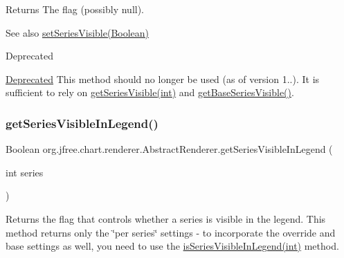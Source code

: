 \begin{DoxyReturn}{Returns}
The flag (possibly {\ttfamily null}).
\end{DoxyReturn}
\begin{DoxySeeAlso}{See also}
\mbox{\hyperlink{classorg_1_1jfree_1_1chart_1_1renderer_1_1_abstract_renderer_a0d8478845dba91f92a5d6b5d3b97b0d1}{set\+Series\+Visible(\+Boolean)}}
\end{DoxySeeAlso}
\begin{DoxyRefDesc}{Deprecated}
\item[\mbox{\hyperlink{deprecated__deprecated000110}{Deprecated}}]This method should no longer be used (as of version 1..). It is sufficient to rely on \mbox{\hyperlink{classorg_1_1jfree_1_1chart_1_1renderer_1_1_abstract_renderer_a4807cc403de1b6e06fcbbdebee5b5ed4}{get\+Series\+Visible(int)}} and \mbox{\hyperlink{classorg_1_1jfree_1_1chart_1_1renderer_1_1_abstract_renderer_a854c652505643472b823747703d8b3ca}{get\+Base\+Series\+Visible()}}. \end{DoxyRefDesc}
\mbox{\label{classorg_1_1jfree_1_1chart_1_1renderer_1_1_abstract_renderer_aad277f984aba334ec761085b48ace9f5}} 
\subsubsection{\texorpdfstring{get\+Series\+Visible\+In\+Legend()}{getSeriesVisibleInLegend()}\hspace{0.1cm}{\footnotesize\ttfamily [1/2]}}
{\footnotesize\ttfamily Boolean org.\+jfree.\+chart.\+renderer.\+Abstract\+Renderer.\+get\+Series\+Visible\+In\+Legend (\begin{DoxyParamCaption}\item[{int}]{series }\end{DoxyParamCaption})}

Returns the flag that controls whether a series is visible in the legend. This method returns only the \char`\"{}per series\char`\"{} settings -\/ to incorporate the override and base settings as well, you need to use the \mbox{\hyperlink{classorg_1_1jfree_1_1chart_1_1renderer_1_1_abstract_renderer_acdf46f032810ca5b9c467ab47a8ad087}{is\+Series\+Visible\+In\+Legend(int)}} method.



